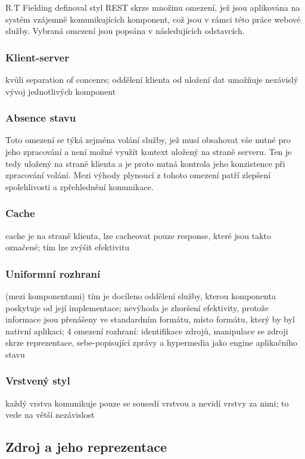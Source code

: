 \documentclass[czech,DP]{thesiskiv}
\begin{document}
R.T Fielding definoval styl REST skrze množinu omezení, jež jsou aplikována na systém vzájemně komunikujících komponent, což jsou v rámci této práce webové služby. Vybraná omezení jsou popsána v následujících odstavcích.

\subsubsection{Klient-server}
kvůli separation of concenrs; oddělení klienta od uložení dat umožňuje nezávislý vývoj jednotlivých komponent

\subsubsection{Absence stavu}

Toto omezení se týká zejména volání služby, jež musí obsahovat vše nutné pro jeho zpracování a není možné využít kontext uložený na straně serveru. Ten je tedy uložený na straně klienta a je proto nutná kontrola jeho konzistence při zpracování volání. Mezi výhody plynoucí z tohoto omezení patří zlepšení spolehlivosti a zpřehlednění komunikace.

\subsubsection{Cache}
cache je na straně klienta, lze cacheovat pouze response, které jsou takto označené; tím lze zvýšit efektivitu

\subsubsection{Uniformní rozhraní}
(mezi komponentami)
tím je docíleno oddělení služby, kterou komponenta poskytuje od její implementace; nevýhoda je zhoršení efektivity, protože informace jsou přenášeny ve standardním formátu, místo formátu, který by byl nativní aplikaci; 4 omezení rozhraní: identifikace zdrojů, manipulace se zdroji skrze reprezentace, sebe-popisující zprávy a hypermedia jako engine aplikačního stavu

\subsubsection{Vrstvený styl}
každý vrstva komunikuje pouze se sousedí vrstvou a nevidí vrstvy za nimi; to vede na větší nezávislost

\subsection{Zdroj a jeho reprezentace}
\label{sec:rest-basics}
\end{document}
